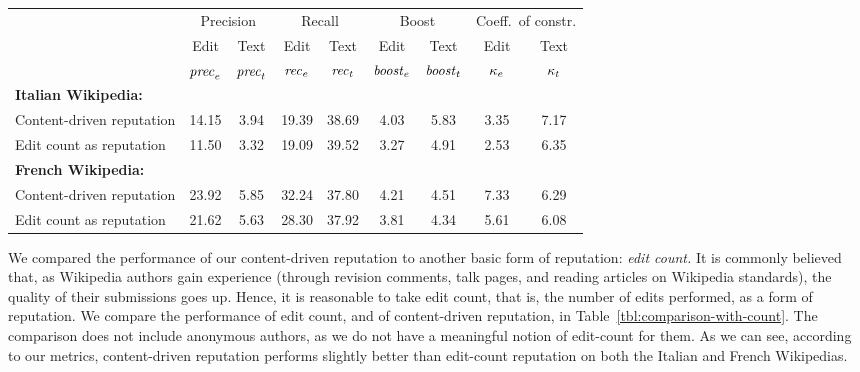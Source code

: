 \begin{table*}
\begin{center}
\begin{tabular}{|l||c|c||c|c||c|c||c|c|} \hline
 & \multicolumn{2}{|c||}{Precision}
 & \multicolumn{2}{|c||}{Recall}
 & \multicolumn{2}{|c||}{Boost}
 & \multicolumn{2}{|c|}{Coeff.\ of constr.} \\
 & Edit & Text & Edit & Text  & Edit & Text & Edit & Text \\
 & ${\text{\textit{prec}}}_e$ & ${\text{\textit{prec}}}_t$ & ${\text{\textit{rec}}}_e$ & ${\text{\textit{rec}}}_t$ & ${\text{\textit{boost}}}_e$ & ${\text{\textit{boost}}}_t$ 
 & $\kappa_e$ & $\kappa_t$ \\[0.5ex] \hline 
\textbf{Italian Wikipedia:} & & & & & & & & \\
\qquad Content-driven reputation & 14.15 &  3.94 & 19.39 & 38.69 & 4.03 & 5.83 & 3.35 & 7.17 \\
\qquad Edit count as reputation  & 11.50 &  3.32 & 19.09 & 39.52 & 3.27 & 4.91 & 2.53 & 6.35 \\ \hline
\textbf{French Wikipedia:} & & & & & & & & \\
\qquad Content-driven reputation & 23.92 &  5.85 & 32.24 & 37.80 & 4.21 & 4.51 & 7.33 & 6.29 \\
\qquad Edit count as reputation &  21.62 &  5.63 & 28.30 & 37.92 & 3.81 & 4.34 & 5.61 & 6.08 \\ \hline
\end{tabular}
\end{center}
\caption{Summary of the performance of content-driven reputation over
the Italian and French Wikipedias. All data are expressed as
percentages. Anonymous authors are not included in the comparison.}
\label{tbl:comparison-with-count} 
\end{table*}

We compared the performance of our content-driven reputation to 
another basic form of reputation: {\em edit count.} 
It is commonly believed that, as Wikipedia authors gain experience
(through revision comments, talk pages, and reading articles on
Wikipedia standards), the quality of their submissions goes up.
Hence, it is reasonable to take edit count, that is, the number of
edits performed, as a form of reputation. 
We compare the performance of edit count, and of content-driven
reputation, in Table~\ref{tbl:comparison-with-count}. 
The comparison does not include anonymous authors, as we do not have a
meaningful notion of edit-count for them. 
As we can see, according to our metrics, content-driven reputation
performs slightly better than edit-count reputation on both the Italian 
and French Wikipedias. 

